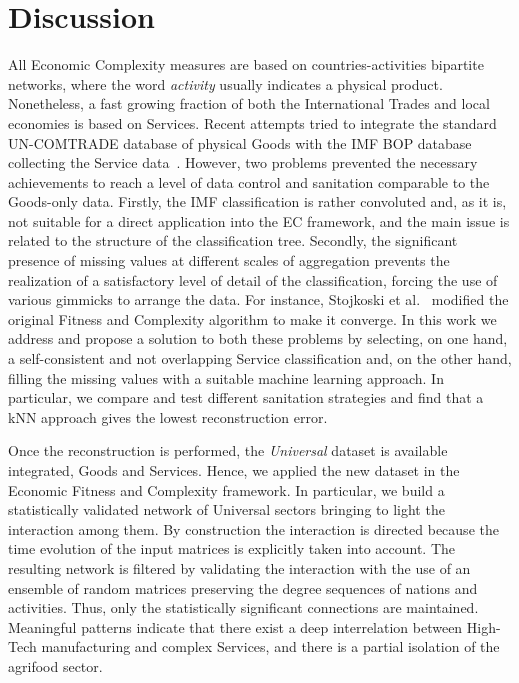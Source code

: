 \documentclass[fleqn,10pt]{article}
\begin{document}
\section*{Discussion}
All Economic Complexity measures are based on countries-activities bipartite networks, where the word \textit{activity} usually indicates a physical product. %
Nonetheless, a fast growing fraction of both the International Trades and local economies is based on Services.
Recent attempts tried to integrate the standard UN-COMTRADE database of physical Goods with the IMF BOP database collecting the Service data~\cite{Stojkoski2016,Zaccaria2018services,Mishra2020}.
However, two problems prevented the necessary achievements to reach a level of data control and sanitation comparable to the Goods-only data.
Firstly, the IMF classification is rather convoluted and, as it is, not suitable for a direct application into the EC framework, and the main issue is related to the structure of the classification tree.
Secondly, the significant presence of missing values at different scales of aggregation prevents the realization of a satisfactory level of detail of the classification, forcing the use of various gimmicks to arrange the data.
For instance, Stojkoski et al.~\cite{Stojkoski2016} modified the original Fitness and Complexity algorithm to make it converge. 
In this work we address and propose a solution to both these problems by selecting, on one hand, a self-consistent and not overlapping Service classification and, on the other hand, filling the missing values with a suitable machine learning approach. 
In particular, we compare and test different sanitation strategies and find that a kNN approach gives the lowest reconstruction error.

Once the reconstruction is performed, the \textit{Universal} dataset is available integrated, Goods and Services.
Hence, we applied the new dataset in the Economic Fitness and Complexity framework.
In particular, we build a statistically validated network of Universal sectors bringing to light the interaction among them. 
By construction the interaction is directed because the time evolution of the input matrices is explicitly taken into account.%
The resulting network is filtered by validating the interaction with the use of an ensemble of random matrices preserving the degree sequences of nations and activities. 
Thus, only the statistically significant connections are maintained.
Meaningful patterns indicate that there exist a deep interrelation between High-Tech manufacturing and complex Services, and there is a partial isolation of the agrifood sector.
\end{document}
